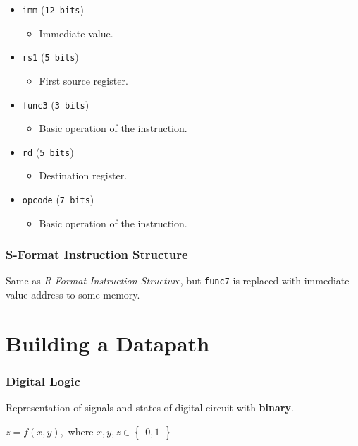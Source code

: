 \documentclass[12pt, letterpaper]{article}
\begin{document}
\begin{itemize}
  \item \texttt{imm} (\texttt{12 bits})
    \begin{itemize}
      \item Immediate value.
    \end{itemize}
  \item \texttt{rs1} (\texttt{5 bits})
    \begin{itemize}
      \item First source register.
    \end{itemize}
  \item \texttt{func3} (\texttt{3 bits})
    \begin{itemize}
      \item Basic operation of the instruction.
    \end{itemize}
  \item \texttt{rd} (\texttt{5 bits})
    \begin{itemize}
      \item Destination register.
    \end{itemize}
  \item \texttt{opcode} (\texttt{7 bits})
    \begin{itemize}
      \item Basic operation of the instruction.
    \end{itemize}
\end{itemize}

\section*{S-Format Instruction Structure}

Same as \textit{R-Format Instruction Structure}, but \texttt{func7}
is replaced with immediate-value address to some memory.

\part*{Building a Datapath}

\section*{Digital Logic}

Representation of signals and states of digital circuit with
\textbf{binary}.

\medskip
{\centering

  $ z = f(x, y), $ where $ x, y, z \in
  \begin{Bmatrix} 0, 1
  \end{Bmatrix} $

}
\medskip
\end{document}
